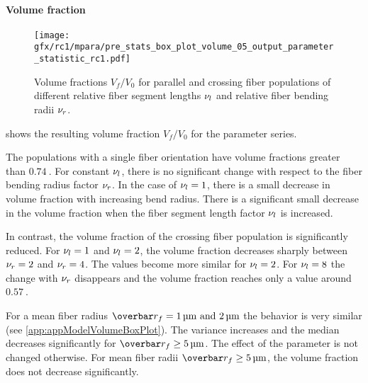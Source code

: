 \paragraph{Volume fraction}
%
\begin{figure}[!t]
\centering
\texttt{[image: gfx/rc1/mpara/pre\_stats\_box\_plot\_volume\_05\_output\_parameter\_statistic\_rc1.pdf]}
\caption{Volume fractions $V_f/V_0$ for parallel \pfbs{} and crossing \cfbs{} fiber populations of different relative fiber segment lengths $\textnormal{$\nu_{l}$}$ and relative fiber bending radii $\textnormal{$\nu_{r}$}$.}
\label{fig:psbp1}
\end{figure}
 shows the resulting volume fraction $V_f/V_0$ for the parameter series.
\par
%
The populations with a single fiber orientation \pfbs{} have volume fractions greater than $\SI{0.74}{}$.
For constant $\textnormal{$\nu_{l}$}$, there is no significant change with respect to the fiber bending radius factor $\textnormal{$\nu_{r}$}$.
In the case of $\textnormal{$\nu_{l}$} = \SI{1}{}$, there is a small decrease in volume fraction with increasing bend radius.
There is a significant small decrease in the volume fraction when the fiber segment length factor $\textnormal{$\nu_{l}$}$ is increased.
\par
%
In contrast, the volume fraction of the crossing fiber population \cfbs{} is significantly reduced.
For $\textnormal{$\nu_{l}$}=\SI{1}{}$ and $\textnormal{$\nu_{l}$}=\SI{2}{}$, the volume fraction decreases sharply between $\textnormal{$\nu_{r}$} = \SI{2}{}$ and $\textnormal{$\nu_{r}$} = \SI{4}{}$.
The values become more similar for $\textnormal{$\nu_{l}$}=\SI{2}{}$.
For $\textnormal{$\nu_{l}$}=\SI{8}{}$ the change with $\textnormal{$\nu_{r}$}$ disappears and the volume fraction reaches only a value around $\SI{0.57}{}$.
\par
%
For a mean fiber radius $\fiberRadiusMean = \SIlist{1;2}{\micro\meter}$ the behavior is very similar (see \cref{app:appModelVolumeBoxPlot}).
The variance increases and the median decreases significantly for $\fiberRadiusMean \geq \SI{5}{\micro\meter}$.
The effect of the parameter is not changed otherwise.
For mean fiber radii $\fiberRadiusMean \geq \SI{5}{\micro\meter}$, the volume fraction does not decrease significantly.
% 
% 
% 
